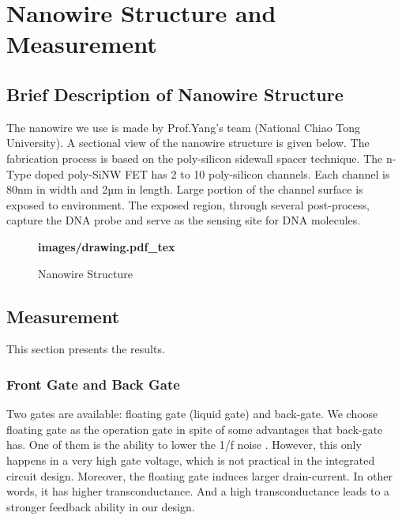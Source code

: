 \chapter{Nanowire Structure and Measurement}
\section{Brief Description of Nanowire Structure}
The nanowire we use is made by Prof.Yang's team (National Chiao Tong University)\cite{J8}.
A sectional view of the nanowire structure is given below.
The fabrication process is based on the poly-silicon sidewall spacer technique.
The n-Type doped poly-SiNW FET has 2 to 10 poly-silicon channels.
Each channel is 80nm in width and 2µm in length.
Large portion of the channel surface is exposed to environment.
The exposed region, through several post-process, capture the DNA probe and serve as the sensing site for DNA molecules.\cite{C5, C6}

\begin{figure}[!htbp]
    \centering
    {\selectfont\textbf{
        \def\svgwidth{5.0cm}
        \fontsize{6}{7}\selectfont
         {images/drawing.pdf_tex}
    }}
    \fontsize{6}{7}\selectfont
    \caption{Nanowire Structure}
    \label{fig:res}
\end{figure}



\section{Measurement}
This section presents the results.

\subsection*{Front Gate and Back Gate}
Two gates are available: floating gate (liquid gate) and back-gate.
We choose floating gate as the operation gate in spite of some advantages that back-gate has.
One of them is the ability to lower the 1/f noise \cite{C7, C8}.
However, this only happens in a very high gate voltage, which is not practical in the integrated circuit design.
Moreover, the floating gate induces larger drain-current.
In other words, it has higher transconductance. And a high transconductance leads to a stronger feedback ability in our design.

%


